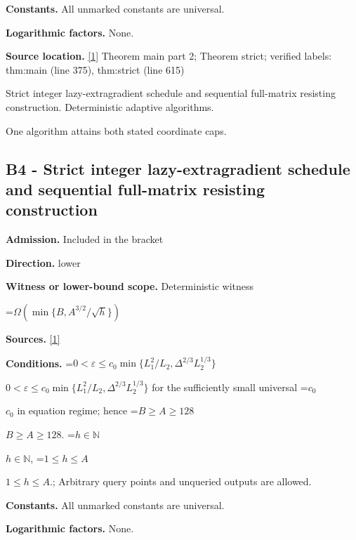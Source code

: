 \documentclass[10pt,a4paper]{article}
\newcommand{\AtlasMath}[1]{\par\begingroup\centering\setbox0=\hbox{$\displaystyle #1$}\ifdim\wd0>1.4\linewidth\typeout{ATLAS WIDE FORMULA: \the\wd0}\fi\ifdim\wd0>\linewidth\resizebox{\linewidth}{!}{\box0}\else\box0\fi\par\endgroup}
\newcommand{\AtlasInlineMath}[1]{\begingroup\setbox0=\hbox{$#1$}\ifdim\wd0>.4\linewidth\endgroup\AtlasMath{#1}\else\endgroup$#1$\fi}
\begin{document}
\textbf{Constants.} All unmarked constants are universal.



\textbf{Logarithmic factors.} None.



\textbf{Source location.} \href{https://github.com/WU-Wendao/Colombo/blob/main/colombo_sensorium/Complexity_altas/data/sources/colombo/0904/manuscript.pdf}{[1]} Theorem main part 2; Theorem strict; verified labels: thm:main (line 375), thm:strict (line 615)



Strict integer lazy-extragradient schedule and sequential full-matrix resisting construction. Deterministic adaptive algorithms.



One algorithm attains both stated coordinate caps.



\subsection{B4 - Strict integer lazy-extragradient schedule and sequential full-matrix resisting construction}


\textbf{Admission.} Included in the bracket



\textbf{Direction.} lower



\textbf{Witness or lower-bound scope.} Deterministic witness



\AtlasMath{\Omega\!\left(\min\{B,A^{3/2}/\sqrt h\}\right)}


\textbf{Sources.} \href{https://github.com/WU-Wendao/Colombo/blob/main/colombo_sensorium/Complexity_altas/data/sources/colombo/0904/manuscript.pdf}{[1]}



\textbf{Conditions.} \AtlasInlineMath{0<\varepsilon\le c_0\min\{L_1^2/L_2,\Delta^{2/3}L_2^{1/3}\}} for the sufficiently small universal \AtlasInlineMath{c_0} in equation regime; hence \AtlasInlineMath{B\ge A\ge128}. \AtlasInlineMath{h\in\mathbb N}, \AtlasInlineMath{1\le h\le A}.; Arbitrary query points and unqueried outputs are allowed.



\textbf{Constants.} All unmarked constants are universal.



\textbf{Logarithmic factors.} None.
\end{document}
